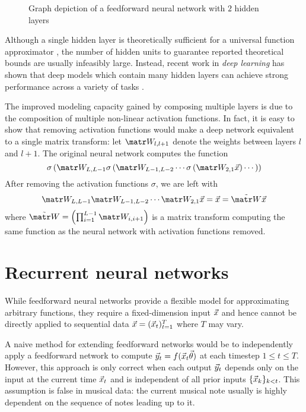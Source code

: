 \begin{figure}[tb]
    \centering
    
    \caption{Graph depiction of a feedforward neural network with $2$ hidden layers}
    \label{fig:nn-ffw}
\end{figure}

Although a single hidden layer is theoretically sufficient for a universal
function approximator \citep{Cybenko1993}, the number of hidden units to
guarantee reported theoretical bounds are usually infeasibly large. Instead,
recent work in \emph{deep learning} has shown that deep models which contain
many hidden layers can achieve strong performance across a variety of
tasks \citep{Bengio2011}.

The improved modeling capacity gained by composing multiple layers is due to
the composition of multiple non-linear activation functions.
In fact, it is easy to show that removing activation functions would make
a deep network equivalent to a single matrix transform: let $\W_{l,l+1}$
denote the weights between layers $l$ and $l+1$. The original neural network
computes the function
\begin{equation}
    \sigma\left(
        \W_{L,L-1} \sigma \left(
            \W_{L-1,L-2}\cdots \sigma \left(
                \W_{2,1} \x
            \right) \cdots
        \right)
    \right)
\end{equation}
After removing the activation functions $\sigma$, we are left with
\begin{equation}
    \W_{L,L-1} \W_{L-1,L-2}\cdots \W_{2,1} \x
    = \x
    = \tilde{\W} \x
\end{equation}
where $\tilde{\W} = \left(\prod_{i=1}^{L-1} \W_{i,i+1} \right)$
is a matrix transform computing the same function as the neural network with
activation functions removed.

\section{Recurrent neural networks}

While feedforward neural networks provide a flexible model for approximating
arbitrary functions, they require a fixed-dimension input $\vec{x}$ and hence
cannot be directly applied to sequential data $\vec{x} = (\vec{x}_t)_{t=1}^T$ where $T$ may
vary.

A naive method for extending feedforward networks would be to independently
apply a feedforward network to compute $\vec{y}_t = f(\vec{x}_t \vec{\theta})$ at each timestep
$1 \leq t \leq T$. However, this approach is only correct when each output
$\vec{y}_t$ depends only on the input at the current time $\vec{x}_t$ and is independent of
all prior inputs $\{\vec{x}_k\}_{k < t}$. This assumption is false in musical data:
the current musical note usually is highly dependent on the sequence of notes
leading up to it.

